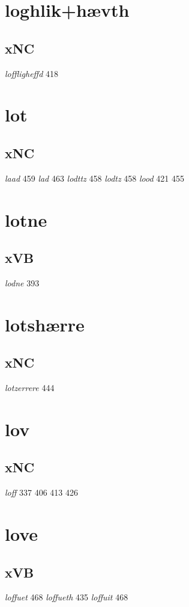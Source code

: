 \documentclass[a4paper,twocolumn]{article}
\begin{document}
\section{loghlik+hævth}
\label{sec:orgdbfd81d}
\subsection{xNC}
\label{sec:org8471407}
\emph{loffligheffd} 418 
\section{lot}
\label{sec:org3b3a55b}
\subsection{xNC}
\label{sec:org6e2801f}
\emph{laad} 459 \emph{lad} 463 \emph{lodttz} 458 \emph{lodtz} 458 \emph{lood} 421 455 
\section{lotne}
\label{sec:orga1bd843}
\subsection{xVB}
\label{sec:orgaffb262}
\emph{lodne} 393 
\section{lotshærre}
\label{sec:org9584a97}
\subsection{xNC}
\label{sec:org96dfe28}
\emph{lotzerrere} 444 
\section{lov}
\label{sec:org65bb4ed}
\subsection{xNC}
\label{sec:org2d8ed06}
\emph{loff} 337 406 413 426 
\section{love}
\label{sec:org78a358a}
\subsection{xVB}
\label{sec:org27142ae}
\emph{loffuet} 468 \emph{loffueth} 435 \emph{loffuit} 468 
\end{document}
